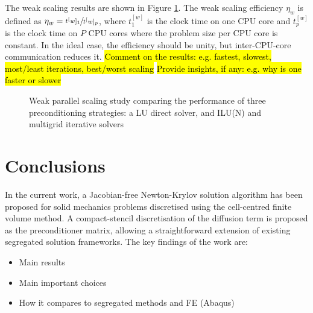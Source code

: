 \documentclass[sn-mathphys,Numbered,draft]{sn-jnl}%
\begin{document}
The weak scaling results are shown in Figure \ref{fig:parallelisation_weak}.
The weak scaling efficiency $\eta_w$ is defined as $\eta_w = \sfrac{t^[w]_1}{t^[w]_p}$, where $t^[w]_1$ is the clock time on one CPU core and $t^[w]_p$ is the clock time on $P$ CPU cores where the problem size per CPU core is constant.
In the ideal case, the efficiency should be unity, but inter-CPU-core communication reduces it.
\hl{Comment on the results: e.g. fastest, slowest, most/least iterations, best/worst scaling}
\hl{Provide insights, if any: e.g. why is one faster or slower}
\begin{figure}[htbp]
	\centering
	\caption{Weak parallel scaling study comparing the performance of three preconditioning strategies: a LU direct solver, and ILU(N) and multigrid iterative solvers}
	\label{fig:parallelisation_weak}
\end{figure}



\section{Conclusions} \label{sec:conclusion}
In the current work, a Jacobian-free Newton-Krylov solution algorithm has been proposed for solid mechanics problems discretised using the cell-centred finite volume method.
A compact-stencil discretisation of the diffusion term is proposed as the preconditioner matrix, allowing a straightforward extension of existing segregated solution frameworks.
The key findings of the work are:
\begin{itemize}
	\item Main results
	\item Main important choices
	\item How it compares to segregated methods and FE (Abaqus)
\end{itemize}
\end{document}
